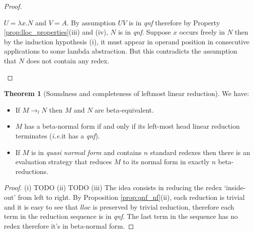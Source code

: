 \documentclass{article}
\makeatletter
\theoremstyle{definition}
\newtheorem{theorem}{Theorem}[section]
\renewcommand\ie{{\it i.e.\@\xspace}}
\makeatother
\begin{document}
\begin{proof}
\begin{compactitem}
\begin{compactitem}
  \item[(3)] $U = \lambda x . N$ and $V = A$.
  By assumption $UV$ is in \emph{qnf} therefore by Property \ref{prop:lloc_properties}(iii) and (iv), $N$ is in \emph{qnf}.
  Suppose $x$ occurs freely in $N$ then by the induction hypothesis (i), it must appear in operand position in consecutive applications to some lambda abstraction. But this contradicts the assumption that $N$ does not contain any redex.
\end{compactitem}
\end{compactitem}
\end{proof}

\begin{theorem}[Soundness and completeness of leftmost linear reduction]
\label{thm:soundness_leftmostlinearred}
We have:
\begin{itemize}
\item[(i)] If $M \rightarrow_{l} N$ then $M$ and $N$ are beta-equivalent.
\item[(ii)] $M$ has a beta-normal form if and only if its left-most head linear reduction terminates (\ie it has a \emph{qnf}).
\item[(iii)] If $M$ is in \emph{quasi normal form} and contains $n$ standard redexes then there is an evaluation strategy that reduces $M$ to its normal form in exactly $n$ beta-reductions.
\end{itemize}
\end{theorem}
\begin{proof}
(i) TODO
(ii) TODO
(iii) The idea consists in reducing the redex `inside-out' from left to right. By Proposition \ref{prop:qnf_nf}(ii), each reduction is trivial and it is easy to see that  $lloc$ is preserved by trivial reduction, therefore each term in the reduction sequence is in \emph{qnf}. The last term in the sequence has no redex therefore it's in beta-normal form.
\end{proof}
\end{document}
